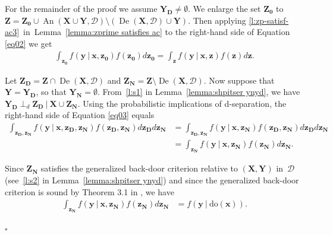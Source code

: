 \documentclass[11pt,a4paper]{article}
\newcommand{\ddo}{\textrm{do}}
\newcommand\given[1][]{\:#1\vert\:}
\newcommand{\dsepp}{\perp_{d}}
\newenvironment{proofof}[1][]{\begin{trivlist}
   \item[\hskip \labelsep {\bfseries Proof of #1.}]}{\hfill{}$\square$\end{trivlist}}
\DeclareMathOperator{\De}{De}
\DeclareMathOperator{\An}{An}
\newcommand{\g}[1][G]{\mathcal{#1}}
\begin{document}
\begin{proofof}[Theorem~\ref{theorem:soundness ac}]
For the remainder of the proof we assume $\mathbf{Y_D} \neq \emptyset$. We enlarge the set $\mathbf{Z_0}$ to $\mathbf{Z} = \mathbf{Z_0} \cup \An(\mathbf{X} \cup \mathbf{Y},\g[D]) \setminus ( \De(\mathbf{X}, \g[D]) \cup \mathbf{Y})$.
Then applying \ref{l:zp-satisf-ac3}~in~Lemma~\ref{lemma:zprime satisfies ac} to the right-hand side of Equation \eqref{eq02} we get
\begin{align}
\int_{\mathbf{z_0}} f( \mathbf{y} \given \mathbf{x,}\mathbf{z_0}) f(\mathbf{z_0})d\mathbf{z_0} = \int_{\mathbf{z}} f( \mathbf{y} \given \mathbf{x,z}) f(\mathbf{z})d\mathbf{z} .
\label{eq03}
\end{align}

Let $\mathbf{Z_D} = \mathbf{Z} \cap \De(\mathbf{X}, \g[D])$ and $\mathbf{Z_N} = \mathbf{Z} \setminus \De(\mathbf{X}, \g[D])$.
Now suppose that $\mathbf{Y} = \mathbf{Y_D}$, so that $\mathbf{Y_N} = \emptyset$. From~\ref{l:s1} in Lemma~\ref{lemma:shpitser ynyd}, we have $\mathbf{Y_D} \dsepp \mathbf{Z_D} \given \mathbf{X} \cup \mathbf{Z_N}$.
Using the probabilistic implications of d-separation, the right-hand side of Equation \eqref{eq03} equals
\begin{align}
\int_{\mathbf{z_D,z_N}} f( \mathbf{y} \given \mathbf{x,z_D,z_N})  f(\mathbf{z_D,z_N})d\mathbf{z_D}d\mathbf{z_N} &= \int_{\mathbf{z_D,z_N}} f( \mathbf{y} \given \mathbf{x,z_N})  f(\mathbf{z_D,z_N})d\mathbf{z_D}d\mathbf{z_N} \nonumber \\
&= \int_{\mathbf{z_N}} f( \mathbf{y} \given \mathbf{x,z_N}) f(\mathbf{z_N})d\mathbf{z_N}. \label{eq3}
\end{align}

Since $\mathbf{Z_N}$ satisfies the generalized back-door criterion relative to $(\mathbf{X,Y})$ in~$\g[D]$ (see~\ref{l:s2} in Lemma~\ref{lemma:shpitser ynyd}) and since the generalized back-door criterion is sound by Theorem 3.1 in \cite{maathuis2013generalized}, we have
\begin{align}
\int_{\mathbf{z_N}} f( \mathbf{y} \given \mathbf{x,z_N}) f(\mathbf{z_N}) d\mathbf{z_N}
& = f(\mathbf{y} \given \ddo(\mathbf{x})). \label{eq33}
\end{align}


\end{proofof}
\end{document}
